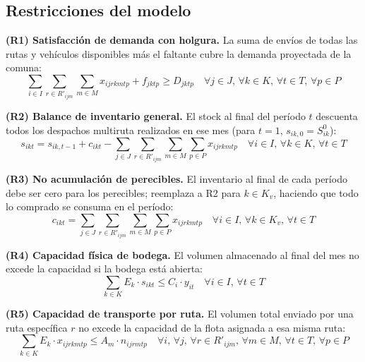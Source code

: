 \documentclass[letterpaper]{article}
\begin{document}
\begin{flushleft}
\subsection{Restricciones del modelo}

\textbf{(R1) Satisfacción de demanda con holgura.} La suma de envíos de todas las rutas y vehículos disponibles más el faltante cubre la demanda proyectada de la comuna:
\begin{equation}
\sum_{i \in I} \sum_{r \in R'_{ijm}} \sum_{m \in M} x_{ijrkmtp} + f_{jktp} \geq D_{jktp}
\quad \forall j \in J,\, \forall k \in K,\, \forall t \in T,\, \forall p \in P
\end{equation}

\textbf{(R2) Balance de inventario general.} El stock al final del período $t$ descuenta todos los despachos multiruta realizados en ese mes (para $t=1$, $s_{ik,0} = S^0_{ik}$):
\begin{equation}
s_{ikt} = s_{ik,t-1} + c_{ikt} - \sum_{j \in J} \sum_{r \in R'_{ijm}} \sum_{m \in M} \sum_{p \in P} x_{ijrkmtp}
\quad \forall i \in I,\, \forall k \in K,\, \forall t \in T
\end{equation}

\textbf{(R3) No acumulación de perecibles.} El inventario al final de cada período debe ser cero para los perecibles; reemplaza a R2 para $k \in K_v$, haciendo que todo lo comprado se consuma en el período:
\begin{equation}
c_{ikt} = \sum_{j \in J} \sum_{r \in R'_{ijm}} \sum_{m \in M} \sum_{p \in P} x_{ijrkmtp}
\quad \forall i \in I,\, \forall k \in K_v,\, \forall t \in T
\end{equation}

\textbf{(R4) Capacidad física de bodega.} El volumen almacenado al final del mes no excede la capacidad si la bodega está abierta:
\begin{equation}
\sum_{k \in K} E_k \cdot s_{ikt} \leq C_i \cdot y_{it} \quad \forall i \in I,\, \forall t \in T
\end{equation}

\textbf{(R5) Capacidad de transporte por ruta.} El volumen total enviado por una ruta específica $r$ no excede la capacidad de la flota asignada a esa misma ruta:
\begin{equation}
\sum_{k \in K} E_k \cdot x_{ijrkmtp} \leq A_m \cdot n_{ijrmtp}
\quad \forall i,\, \forall j,\, \forall r \in R'_{ijm},\, \forall m \in M,\, \forall t \in T,\, \forall p \in P
\end{equation}


\end{flushleft}
\end{document}
